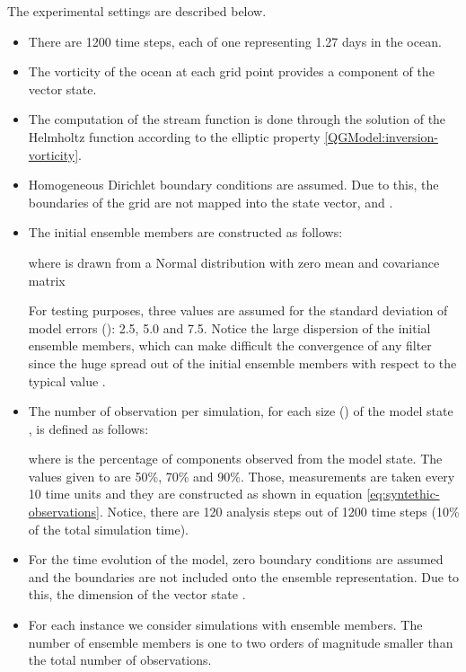 \documentclass[12pt]{article}
\begin{document}
The experimental settings are described below.
\begin{itemize}
\item There are 1200 time steps, each of one representing 1.27 days in the ocean.
\item The vorticity of the ocean at each grid point provides a component of the vector state. 
\item The computation of the stream function is done through the solution of the Helmholtz \cite{Otto99} function according to the elliptic property \eqref{QGModel:inversion-vorticity}.
\item Homogeneous Dirichlet boundary conditions are assumed. Due to this, the boundaries of the grid are not mapped into the state vector, and .
\item The initial ensemble members are constructed as follows:

where  is drawn from a Normal distribution with zero mean and covariance matrix


For testing purposes, three values are assumed for the standard deviation of model errors (): 2.5, 5.0 and 7.5. Notice the large dispersion of the initial ensemble members, which can make difficult the convergence of any filter since the huge spread out of the initial ensemble members with respect to the typical value . 

\item The number of observation per simulation, for each size () of the model state , is defined as follows:

where  is the percentage of components observed from the model state. The values given to  are 50\%, 70\% and 90\%. Those, measurements are taken every 10 time units and they are constructed as shown in equation \eqref{eq:syntethic-observations}. Notice, there are 120 analysis steps out of 1200 time steps (10\% of the total simulation time).

\item For the time evolution of the model, zero boundary conditions are assumed and the boundaries are not included onto the ensemble representation.  Due to this, the dimension of the vector state .

\item For each instance we consider simulations with  ensemble members. The number of ensemble members is one to two orders of magnitude smaller than the total number of observations.

\end{itemize}
\end{document}
